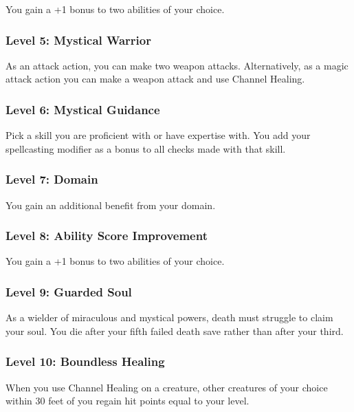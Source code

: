 \documentclass[12pt,letterpaper,twocolumn,openany,nodeprecatedcode,bg=none]{dndbook}
\begin{document}
You gain a +1 bonus to two abilities of your choice.

\subsubsection{Level 5: Mystical
Warrior}\label{level-5-mystical-warrior}

As an attack action, you can make two weapon attacks. Alternatively, as
a magic attack action you can make a weapon attack and use Channel
Healing.

\subsubsection{Level 6: Mystical
Guidance}\label{level-6-mystical-guidance}

Pick a skill you are proficient with or have expertise with. You add
your spellcasting modifier as a bonus to all checks made with that
skill.

\subsubsection{Level 7: Domain}\label{level-7-domain}

You gain an additional benefit from your domain.

\subsubsection{Level 8: Ability Score
Improvement}\label{level-8-ability-score-improvement}

You gain a +1 bonus to two abilities of your choice.

\subsubsection{Level 9: Guarded Soul}\label{level-9-guarded-soul}

As a wielder of miraculous and mystical powers, death must struggle to
claim your soul. You die after your fifth failed death save rather than
after your third.

\subsubsection{Level 10: Boundless
Healing}\label{level-10-boundless-healing}

When you use Channel Healing on a creature, other creatures of your
choice within 30 feet of you regain hit points equal to your level.
\end{document}
